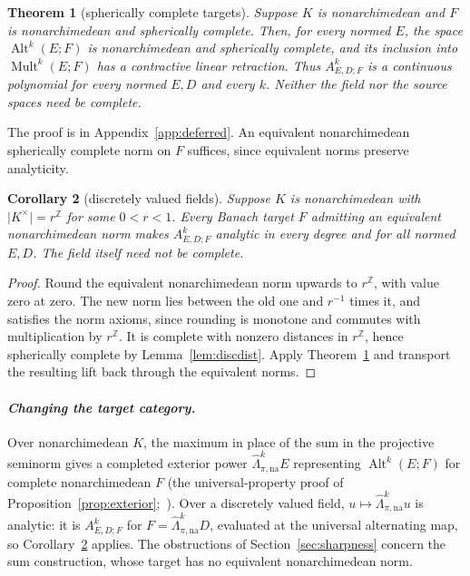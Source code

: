 \documentclass[11pt]{amsart}
\newtheorem{theorem}{Theorem}[section]
\newtheorem{corollary}[theorem]{Corollary}
\theoremstyle{definition}
\theoremstyle{remark}
\numberwithin{equation}{section}
\newcommand{\Z}{\mathbb Z}
\newcommand{\Alt}{\operatorname{Alt}}
\newcommand{\Mult}{\operatorname{Mult}}
\newcommand{\abs}[1]{\lvert #1\rvert}
\theoremstyle{plain}
\theoremstyle{definition}
\theoremstyle{plain}
\begin{document}
\begin{theorem}[spherically complete targets]\label{thm:spherical}
Suppose $K$ is nonarchimedean and $F$ is nonarchimedean and spherically complete. Then, for every normed $E$, the space $\Alt^k(E;F)$ is nonarchimedean and spherically complete, and its inclusion into $\Mult^k(E;F)$ has a contractive linear retraction. Thus $A^k_{E,D;F}$ is a continuous polynomial for every normed $E,D$ and every $k$. Neither the field nor the source spaces need be complete.
\end{theorem}
The proof is in Appendix~\ref{app:deferred}. An equivalent nonarchimedean spherically complete norm on $F$ suffices,
since equivalent norms preserve analyticity.

\begin{corollary}[discretely valued fields]\label{cor:discrete-targets}
Suppose $K$ is nonarchimedean with $\abs{K^\times}=r^\Z$ for some $0<r<1$.
Every Banach target $F$ admitting an equivalent nonarchimedean norm makes $A^k_{E,D;F}$
analytic in every degree and for all normed $E,D$. The field itself need not be complete.
\end{corollary}
\begin{proof}
Round the equivalent nonarchimedean norm upwards to $r^\Z$, with value zero at zero. The new norm lies between the old
one and $r^{-1}$ times it, and satisfies the norm axioms, since rounding is monotone and commutes with multiplication by
$r^\Z$. It is complete with nonzero distances in $r^\Z$, hence spherically complete by Lemma~\ref{lem:discdist}. Apply
Theorem~\ref{thm:spherical} and transport the resulting lift back through the equivalent norms.
\end{proof}

\paragraph{\textit{Changing the target category.}}
Over nonarchimedean $K$, the maximum in place of the sum in the projective seminorm gives a completed exterior power
$\widehat\Lambda^k_{\pi,\mathrm{na}}E$ representing $\Alt^k(E;F)$ for complete nonarchimedean $F$ (the universal-property
proof of Proposition~\ref{prop:exterior};~\cite[\S4]{Se}). Over a discretely valued field,
$u\mapsto\widehat\Lambda^k_{\pi,\mathrm{na}}u$ is analytic: it is $A^k_{E,D;F}$ for $F=\widehat\Lambda^k_{\pi,\mathrm{na}}D$,
evaluated at the universal alternating map, so Corollary~\ref{cor:discrete-targets} applies. The obstructions of
Section~\ref{sec:sharpness} concern the sum construction, whose target has no equivalent nonarchimedean norm.
\end{document}
